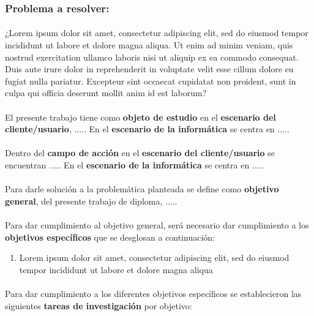 \subsubsection*{Problema a resolver:}
\paragraph{}¿Lorem ipsum dolor sit amet, consectetur adipiscing elit, sed do eiusmod tempor incididunt ut labore et dolore magna aliqua. Ut enim ad minim veniam, quis nostrud exercitation ullamco laboris nisi ut aliquip ex ea commodo consequat. Duis aute irure dolor in reprehenderit in voluptate velit esse cillum dolore eu fugiat nulla pariatur. Excepteur sint occaecat cupidatat non proident, sunt in culpa qui officia deserunt mollit anim id est laborum?
\paragraph{}El presente trabajo tiene como \textbf{objeto de estudio} en el \textbf{escenario del cliente/usuario}, ..... En el \textbf{escenario de la informática} se centra en .....
\paragraph{}Dentro del \textbf{campo de acción} en el \textbf{escenario del cliente/usuario} se encuentran ..... En el \textbf{escenario de la informática} se centra en .....
\paragraph{}Para darle solución a la problemática planteada se define como \textbf{objetivo general}, del presente trabajo de diploma, .....
\paragraph{}Para dar cumplimiento al objetivo general, será necesario dar cumplimiento a los \textbf{objetivos específicos} que se desglosan a continuación:
\begin{enumerate}
	\item Lorem ipsum dolor sit amet, consectetur adipiscing elit, sed do eiusmod tempor incididunt ut labore et dolore magna aliqua
\end{enumerate}

\paragraph{}Para dar cumplimiento a los diferentes objetivos específicos se establecieron las siguientes \textbf{tareas de investigación} por objetivo:

